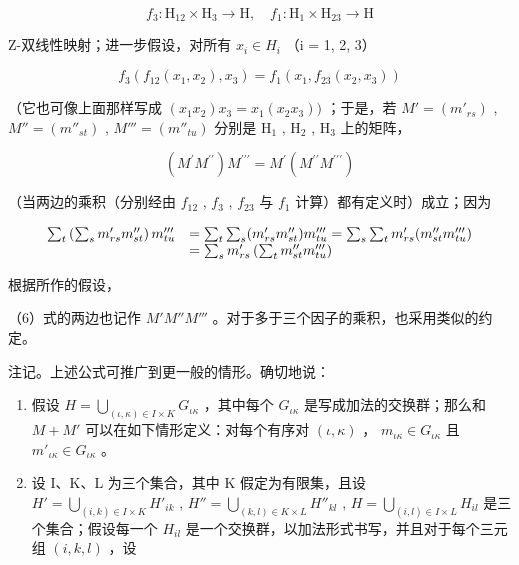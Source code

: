 \[
f _ {3}: \mathrm{H} _ {1 2} \times \mathrm{H} _ {3} \rightarrow \mathrm{H}, \quad f _ {1}: \mathrm{H} _ {1} \times \mathrm{H} _ {2 3} \rightarrow \mathrm{H}
\]

Z-双线性映射；进一步假设，对所有 \(x_{i} \in H_{i}\) （i = 1, 2, 3）

\[
f _ {3} (f _ {1 2} (x _ {1}, x _ {2}), x _ {3}) = f _ {1} (x _ {1}, f _ {2 3} (x _ {2}, x _ {3}))
\]

（它也可像上面那样写成 \((x_{1}x_{2})x_{3} = x_{1}(x_{2}x_{3}))\) ；于是，若 \(M' = (m'_{rs})\) , \(M'' = (m''_{st})\) , \(M''' = (m''_{tu})\) 分别是 \(\mathrm{H}_1\) , \(\mathrm{H}_2\) , \(\mathrm{H}_3\) 上的矩阵，

\[
(M ^ {\prime} M ^ {\prime \prime}) M ^ {\prime \prime \prime} = M ^ {\prime} (M ^ {\prime \prime} M ^ {\prime \prime \prime})\tag{6}
\]

（当两边的乘积（分别经由 \(f_{12}\) , \(f_{3}\) , \(f_{23}\) 与 \(f_{1}\) 计算）都有定义时）成立；因为

\[
\begin{array}{r l} \sum_ {t} \left(\sum_ {s} m _ {r s} ^ {\prime} m _ {s t} ^ {\prime \prime}\right) m _ {t u} ^ {\prime \prime \prime} & = \sum_ {t} \sum_ {s} (m _ {r s} ^ {\prime} m _ {s t} ^ {\prime \prime}) m _ {t u} ^ {\prime \prime \prime} = \sum_ {s} \sum_ {t} m _ {r s} ^ {\prime} (m _ {s t} ^ {\prime \prime} m _ {t u} ^ {\prime \prime \prime}) \\ & = \sum_ {s} m _ {r s} ^ {\prime} \left(\sum_ {t} m _ {s t} ^ {\prime \prime} m _ {t u} ^ {\prime \prime \prime}\right) \end{array}
\]

根据所作的假设，

（6）式的两边也记作 \(M'M''M'''\) 。对于多于三个因子的乘积，也采用类似的约定。

注记。上述公式可推广到更一般的情形。确切地说：

\begin{enumerate}
\def\labelenumi{(\alph{enumi})}
\item
假设 \(H = \bigcup_{(\iota, \kappa) \in I \times K} G_{\iota\kappa}\) ，其中每个 \(G_{\iota\kappa}\) 是写成加法的交换群；那么和 \(M + M'\) 可以在如下情形定义：对每个有序对 \((\iota, \kappa)\) ， \(m_{\iota\kappa} \in G_{\iota\kappa}\) 且 \(m'_{\iota\kappa} \in G_{\iota\kappa}\) 。
\item
  设 I、K、L 为三个集合，其中 K 假定为有限集，且设 \(H' = \bigcup_{(i, k) \in I \times K} H'_{ik}\) , \(H'' = \bigcup_{(k, l) \in K \times L} H''_{kl}\) , \(H = \bigcup_{(i, l) \in I \times L} H_{il}\) 是三个集合；假设每一个 \(H_{il}\) 是一个交换群，以加法形式书写，并且对于每个三元组 \((i, k, l)\) ，设
\end{enumerate}

